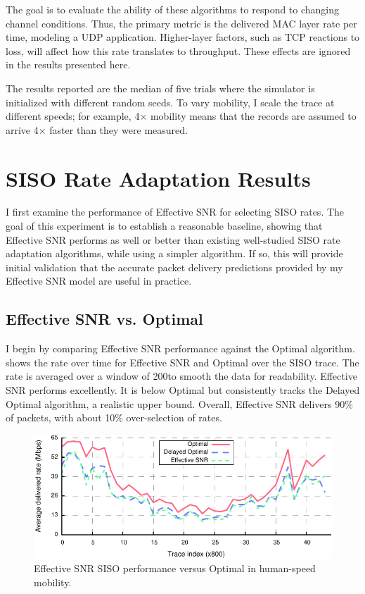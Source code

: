 The goal is to evaluate the ability of these algorithms to respond to changing channel conditions. Thus, the primary metric is the delivered MAC layer rate per time, modeling a UDP application. Higher-layer factors, such as TCP reactions to loss, will affect how this rate translates to throughput. These effects are ignored in the results presented here.

The results reported are the median of five trials where the simulator is initialized with different random seeds. To vary mobility, I scale the trace at different speeds; for example, 4$\times$ mobility means that the records are assumed to arrive 4$\times$ faster than they were measured.

\section{SISO Rate Adaptation Results}
I first examine the performance of Effective SNR for selecting SISO rates. The goal of this experiment is to establish a reasonable baseline, showing that Effective SNR performs as well or better than existing well-studied SISO rate adaptation algorithms, while using a simpler algorithm. If so, this will provide initial validation that the accurate packet delivery predictions provided by my Effective SNR model are useful in practice.

\subsection{Effective SNR vs. Optimal}
I begin by comparing Effective SNR performance against the Optimal algorithm.  shows the rate over time for Effective SNR and Optimal over the SISO trace. The rate is averaged over a window of 200\ms to smooth the data for readability. Effective SNR performs excellently. It is below Optimal but consistently tracks the Delayed Optimal algorithm, a realistic upper bound. Overall, Effective SNR delivers 90\% of packets, with about 10\% over-selection of rates.

\begin{figure}[htbp]
      \centering
      \includegraphics[width=\textwidth]{figures/rate/siso_rate_time.pdf}
      \caption[Effective SNR SISO performance versus Optimal in human-speed mobility]{\label{fig:siso_rate_time_opt_eff} Effective SNR SISO performance versus Optimal in human-speed mobility.}
\end{figure}


